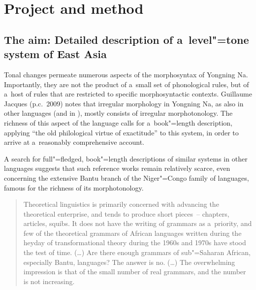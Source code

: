 \section{Project and method}
\label{sec:chronologyofthestudyelicitationproceduresandonlinematerials}

\subsection[The aim: Detailed description of a~level"=tone system]{The aim: Detailed description of a~level"=tone system of East Asia}
\label{sec:theaimofthepresentvolumetoprovideanindepthdescriptionofaneastasianleveltonesystem}

Tonal changes permeate numerous aspects of the morphosyntax of Yongning Na. Importantly, they are
not the product of a~small set of phonological rules, but of a~host of rules that are restricted to
specific morphosyntactic contexts. Guillaume Jacques (p.c.\ 2009) notes that irregular morphology in Yongning Na, as also in
other  languages (and in ), mostly consists of irregular morphotonology. The richness of this aspect of the language calls for a~book"=length description, applying “the old philological virtue of exactitude”
\citep[152]{Scherer1885} to this system, in order to arrive at
a~reasonably comprehensive account.

A search for full"=fledged, book"=length descriptions of similar systems in other languages suggests that such
reference works remain relatively scarce, even concerning the extensive
{Bantu} branch of the Niger"=Congo family of languages, famous for the richness of its morphotonology.

\begin{quotation}
  Theoretical linguistics is primarily concerned with advancing the theoretical enterprise, and
  tends to produce short pieces~-- chapters, articles, squibs. It does not have the writing of
  grammars as a~priority, and few of the theoretical grammars of African languages written during
  the heyday of transformational theory during the 1960s and 1970s have stood the test of time. ({\dots})
  Are there enough grammars of sub"=Saharan African, especially {Bantu}, languages? The answer is
  no. ({\dots}) The overwhelming impression is that of the small number of real grammars, and the number
  is not increasing.~\citep[xxiii--xxiv]{nurse2011}
\end{quotation}


